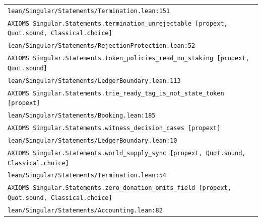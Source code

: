 \begin{longtable}{p{.94\linewidth}}
\nolinkurl{lean/Singular/Statements/Termination.lean:151}\\[5pt]
\texttt{AXIOMS }\nolinkurl{Singular.Statements.termination_unrejectable}\texttt{ [propext, Quot.sound, Classical.choice]}\\
\nolinkurl{lean/Singular/Statements/RejectionProtection.lean:52}\\[5pt]
\texttt{AXIOMS }\nolinkurl{Singular.Statements.token_policies_read_no_staking}\texttt{ [propext, Quot.sound]}\\
\nolinkurl{lean/Singular/Statements/LedgerBoundary.lean:113}\\[5pt]
\texttt{AXIOMS }\nolinkurl{Singular.Statements.trie_ready_tag_is_not_state_token}\texttt{ [propext]}\\
\nolinkurl{lean/Singular/Statements/Booking.lean:185}\\[5pt]
\texttt{AXIOMS }\nolinkurl{Singular.Statements.witness_decision_cases}\texttt{ [propext]}\\
\nolinkurl{lean/Singular/Statements/LedgerBoundary.lean:10}\\[5pt]
\texttt{AXIOMS }\nolinkurl{Singular.Statements.world_supply_sync}\texttt{ [propext, Quot.sound, Classical.choice]}\\
\nolinkurl{lean/Singular/Statements/Termination.lean:54}\\[5pt]
\texttt{AXIOMS }\nolinkurl{Singular.Statements.zero_donation_omits_field}\texttt{ [propext, Quot.sound, Classical.choice]}\\
\nolinkurl{lean/Singular/Statements/Accounting.lean:82}\\[5pt]
\bottomrule
\end{longtable}
\endgroup
